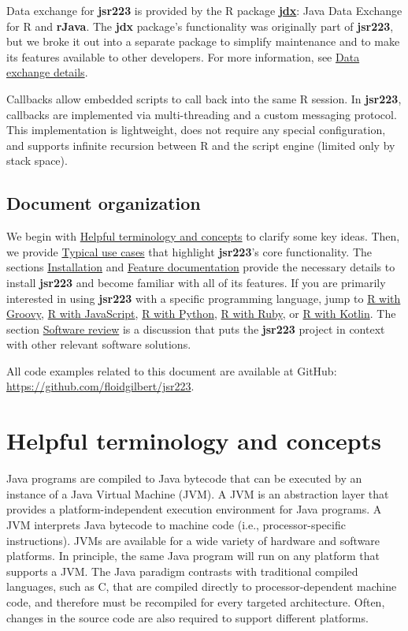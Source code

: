 \documentclass[
article,
11pt, %
a4paper, %
oneside, %
headinclude,footinclude, %
]{scrartcl}
\theoremstyle{definition} %
\theoremstyle{plain} %
\theoremstyle{remark} %
\newcommand{\pkg}[1]{\textbf{#1}}
\newcommand{\CRANpkg}[1]{\href{https://CRAN.R-project.org/package=#1}{\pkg{#1}}}
\begin{document}
Data exchange for \pkg{jsr223} is provided by the R package \CRANpkg{jdx}: Java Data Exchange for R and \pkg{rJava}. The \pkg{jdx} package's functionality was originally part of \pkg{jsr223}, but we broke it out into a separate package to simplify maintenance and to make its features available to other developers. For more information, see \hyperlink{data-exchange-details}{Data exchange details}.

Callbacks allow embedded scripts to call back into the same R session. In \pkg{jsr223}, callbacks are implemented via multi-threading and a custom messaging protocol. This implementation is lightweight, does not require any special configuration, and supports infinite recursion between R and the script engine (limited only by stack space).

\subsection{Document organization}

We begin with \hyperlink{helpful-terminology-and-concepts}{Helpful terminology and concepts} to clarify some key ideas. Then, we provide \hyperlink{typical-use-cases}{Typical use cases} that highlight \pkg{jsr223}'s core functionality. The sections \hyperlink{installation}{Installation} and \hyperlink{feature-documentation}{Feature documentation} provide the necessary details to install \pkg{jsr223} and become familiar with all of its features. If you are primarily interested in using \pkg{jsr223} with a specific programming language, jump to \hyperlink{r-with-groovy}{R with Groovy}, \hyperlink{r-with-javascript}{R with JavaScript}, \hyperlink{r-with-python}{R with Python}, \hyperlink{r-with-ruby}{R with Ruby}, or \hyperlink{r-with-kotlin}{R with Kotlin}. The section \hyperlink{software-review}{Software review} is a discussion that puts the \pkg{jsr223} project in context with other relevant software solutions.

All code examples related to this document are available at GitHub: \url{https://github.com/floidgilbert/jsr223}.

\hypertarget{helpful-terminology-and-concepts}{}
\section{Helpful terminology and concepts}

Java programs are compiled to Java bytecode that can be executed by an instance of a Java Virtual Machine (JVM). A JVM is an abstraction layer that provides a platform-independent execution environment for Java programs. A JVM interprets Java bytecode to machine code (i.e., processor-specific instructions). JVMs are available for a wide variety of hardware and software platforms. In principle, the same Java program will run on any platform that supports a JVM. The Java paradigm contrasts with traditional compiled languages, such as C, that are compiled directly to processor-dependent machine code, and therefore must be recompiled for every targeted architecture. Often, changes in the source code are also required to support different platforms.
\end{document}
